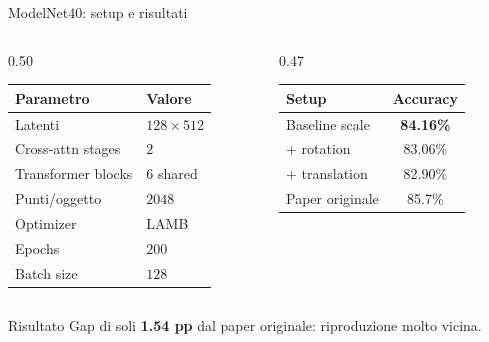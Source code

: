 \documentclass[aspectratio=169,10pt]{beamer}
\newcommand{\good}[1]{\textcolor{AccentGreen}{\textbf{#1}}}
\begin{document}
\begin{frame}{ModelNet40: setup e risultati}
\small
\begin{columns}[T]
\begin{column}{0.50\textwidth}
\begin{tabular}{ll}
\toprule
\textbf{Parametro} & \textbf{Valore} \\
\midrule
Latenti & $128 \times 512$ \\
Cross-attn stages & $2$ \\
Transformer blocks & $6$ shared \\
Punti/oggetto & $2048$ \\
Optimizer & LAMB \\
Epochs & $200$ \\
Batch size & $128$ \\
\bottomrule
\end{tabular}
\end{column}
\begin{column}{0.47\textwidth}
\begin{tabular}{lc}
\toprule
\textbf{Setup} & \textbf{Accuracy} \\
\midrule
Baseline scale & \good{84.16\%} \\
+ rotation & 83.06\% \\
+ translation & 82.90\% \\
Paper originale & 85.7\% \\
\bottomrule
\end{tabular}
\end{column}
\end{columns}

\begin{block}{Risultato}
Gap di soli \textbf{1.54 pp} dal paper originale: riproduzione molto vicina.
\end{block}
\end{frame}
\end{document}
